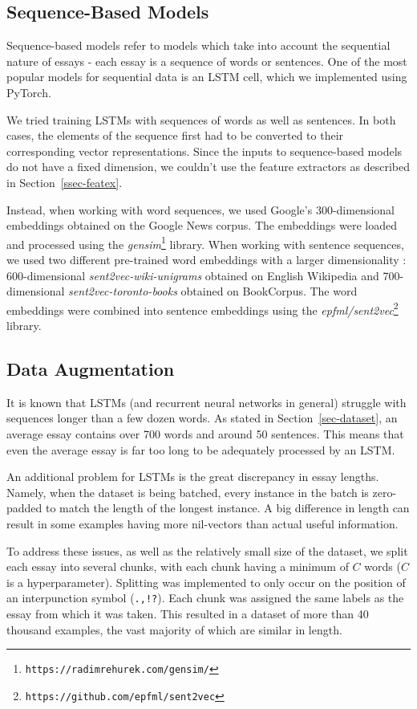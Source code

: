 \documentclass[10pt, a4paper]{article}
\begin{document}
\subsection{Sequence-Based Models}
Sequence-based models refer to models which take into account the sequential nature of essays - each essay is a sequence of words or sentences. One of the most popular models for sequential data is an LSTM cell, which we implemented using PyTorch.

We tried training LSTMs with sequences of words as well as sentences. In both cases, the elements of the sequence first had to be converted to their corresponding vector representations. Since the inputs to sequence-based models do not have a fixed dimension, we couldn't use the feature extractors as described in Section~\ref{ssec-featex}. 

Instead, when working with word sequences, we used Google's 300-dimensional embeddings obtained on the Google News corpus. The embeddings were loaded and processed using the \textit{gensim}\footnote{\texttt{https://radimrehurek.com/gensim/}} library. When working with sentence sequences, we used two different pre-trained word embeddings with a larger dimensionality \citep{sent2vec}: 600-dimensional \textit{sent2vec-wiki-unigrams} obtained on English Wikipedia and 700-dimensional \textit{sent2vec-toronto-books} obtained on  BookCorpus. The word embeddings were combined into sentence embeddings using the \textit{epfml/sent2vec}\footnote{\texttt{https://github.com/epfml/sent2vec}} library.

\subsection{Data Augmentation}
\label{sec:chunk}
It is known that LSTMs (and recurrent neural networks in general) struggle with sequences longer than a few dozen words. As stated in Section~\ref{sec-dataset}, an average essay contains over 700 words and around 50 sentences. This means that even the average essay is far too long to be adequately processed by an LSTM. 

An additional problem for LSTMs is the great discrepancy in essay lengths. Namely, when the dataset is being batched, every instance in the batch is zero-padded to match the length of the longest instance. A big difference in length can result in some examples having more nil-vectors than actual useful information.

To address these issues, as well as the relatively small size of the dataset, we split each essay into several chunks, with each chunk having a minimum of $C$ words ($C$ is a hyperparameter). Splitting was implemented to only occur on the position of an interpunction symbol (\texttt{.,!?}). Each chunk was assigned the same labels as the essay from which it was taken. This resulted in a dataset of more than 40 thousand examples, the vast majority of which are similar in length.
\end{document}
